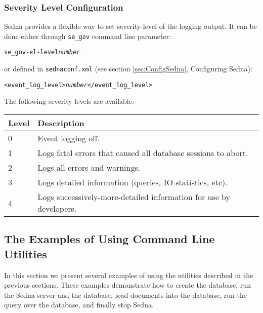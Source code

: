 \documentclass[a4paper,12pt]{article}
\begin{document}
\subsubsection{Severity Level Configuration}
Sedna provides a flexible way to set severity level of the logging output. It
can be done either through \verb!se_gov! command line parameter:

\begin{alltt}
se_gov -el-level \emph{number}
\end{alltt}

or defined in \verb!sednaconf.xml! (see section \ref{sec:ConfigSedna},
Configuring Sedna):

\begin{alltt}
<event_log_level>\emph{number}</event_log_level>
\end{alltt}

The following severity levels are available:
\\
\begin{tabular}{|l|l|}
\hline
\hline
Level    & Description                                                        \\
\hline
\hline
0        & Event logging off.                                                 \\
\hline
1        & Logs fatal errors that caused all database sessions to abort.      \\
\hline
2        & Logs all errors and warnings.                                      \\
\hline
3        & Logs detailed information (queries, IO statistics, etc).           \\
\hline
4        & Logs successively-more-detailed information for use by developers. \\
\hline
\end{tabular}

\subsection{The Examples of Using Command Line Utilities}

In this section we present several examples of using the utilities described in
the previous sections. These examples demonstrate how to create the database,
run the Sedna server and the database, load documents into the database, run the
query over the database, and finally stop Sedna.
\end{document}
